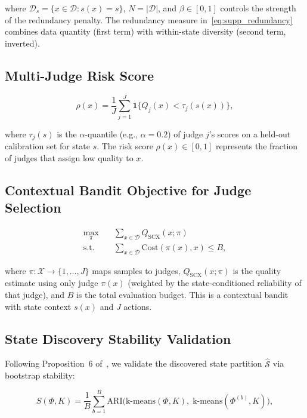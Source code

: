 \documentclass[11pt]{article}
\begin{document}
\noindent where $\mathcal{D}_s = \{x \in \mathcal{D}: s(x) = s\}$, $N = |\mathcal{D}|$, and $\beta \in [0, 1]$ controls the strength of the redundancy penalty. The redundancy measure in~\eqref{eq:supp_redundancy} combines data quantity (first term) with within-state diversity (second term, inverted).

\subsection{Multi-Judge Risk Score}

\begin{equation}
\rho(x) = \frac{1}{J} \sum_{j=1}^J \mathbf{1}\{Q_j(x) < \tau_j(s(x))\},
\label{eq:supp_risk}
\end{equation}

\noindent where $\tau_j(s)$ is the $\alpha$-quantile (e.g., $\alpha = 0.2$) of judge $j$'s scores on a held-out calibration set for state $s$. The risk score $\rho(x) \in [0, 1]$ represents the fraction of judges that assign low quality to $x$.

\subsection{Contextual Bandit Objective for Judge Selection}

\begin{align}
\max_{\pi} &\quad \sum_{x \in \mathcal{D}} Q_{\text{SCX}}(x; \pi) \label{eq:supp_bandit_obj} \\
\text{s.t.} &\quad \sum_{x \in \mathcal{D}} \text{Cost}(\pi(x), x) \leq B, \nonumber
\end{align}

\noindent where $\pi: \mathcal{X} \to \{1, \dots, J\}$ maps samples to judges, $Q_{\text{SCX}}(x; \pi)$ is the quality estimate using only judge $\pi(x)$ (weighted by the state-conditioned reliability of that judge), and $B$ is the total evaluation budget. This is a contextual bandit with state context $s(x)$ and $J$ actions.

\subsection{State Discovery Stability Validation}

Following Proposition~6 of~\cite{scx2026}, we validate the discovered state partition $\hat{\mathcal{S}}$ via bootstrap stability:

\begin{equation}
S(\Phi, K) = \frac{1}{B} \sum_{b=1}^B \text{ARI}\bigl(\text{k-means}(\Phi, K),\; \text{k-means}(\Phi^{(b)}, K)\bigr),
\label{eq:supp_stability}
\end{equation}
\end{document}

